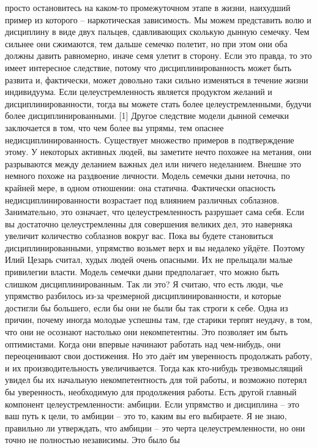 \documentclass[ebook,12pt,oneside,openany]{memoir}
\begin{document}
просто остановитесь на каком-то промежуточном этапе в жизни, наихудший
пример из которого – наркотическая зависимость. Мы можем представить
волю и дисциплину в виде двух пальцев, сдавливающих сколькую дынную
семечку. Чем сильнее они сжимаются, тем дальше семечко полетит, но при
этом они оба должны давить равномерно, иначе семя улетит в сторону.
Если это правда, то это имеет интересное следствие, потому что
дисциплинированность может быть развита и, фактически, может довольно
таки сильно изменяться в течение жизни индивидуума. Если
целеустремленность является продуктом желаний и дисциплинированности,
тогда вы можете стать более целеустремленными, будучи более
дисциплинированными. [1] Другое следствие модели дынной семечки
заключается в том, что чем более вы упрямы, тем опаснее
недисциплинированность. Существует множество примеров в подтверждение
этому. У некоторых активных людей, вы заметите нечто похожее на
метания, они разрываются между деланием важных дел или ничего
неделанием. Внешне это немного похоже на раздвоение личности. Модель
семечки дыни неточна, по крайней мере, в одном отношении: она
статична. Фактически опасность недисциплинированности возрастает под
влиянием различных соблазнов. Занимательно, это означает, что
целеустремленность разрушает сама себя. Если вы достаточно
целеустремленны для совершения великих дел, это наверняка увеличит
количество соблазнов вокруг вас. Пока вы будете становиться
дисциплинированными, упрямство возьмет верх и вы недалеко уйдёте.
Поэтому Илий Цезарь считал, худых людей очень опасными. Их не
прельщали малые привилегии власти. Модель семечки дыни предполагает,
что можно быть слишком дисциплинированным. Так ли это? Я считаю, что
есть люди, чье упрямство разбилось из-за чрезмерной
дисциплинированности, и которые достигли бы большего, если бы они не
были бы так строги к себе. Одна из причин, почему иногда молодые
успешны там, где старики терпят неудачу, в том, что они не осознают
настолько они некомпетентны. Это позволяет им быть оптимистами. Когда
они впервые начинают работать над чем-нибудь, они переоценивают свои
достижения. Но это даёт им уверенность продолжать работу, и их
производительность увеличивается. Тогда как кто-нибудь трезвомыслящий
увидел бы их начальную некомпетентность для той работы, и возможно
потерял бы уверенность, необходимую для продолжения работы. Есть
другой главный компонент целеустремленности: амбиции. Если упрямство и
дисциплина – это ваш путь к цели, то амбиции – это то, каким вы его
выбираете. Я не знаю, правильно ли утверждать, что амбиции – это черта
целеустремленности, но они точно не полностью независимы. Это было бы
\end{document}
